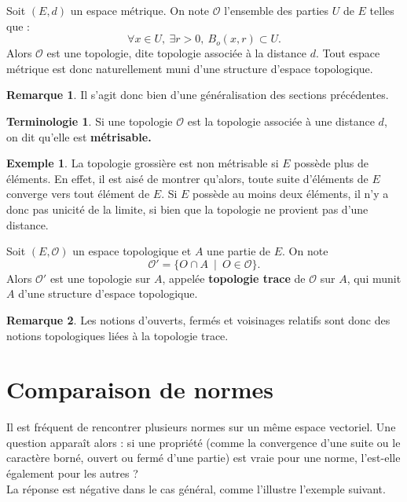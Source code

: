 \documentclass[french]{article}
\theoremstyle{plain}
\theoremstyle{definition}
\newtheorem*{ex}{Exemple}
\newtheorem*{rmq}{Remarque}
\newtheorem*{terminologie}{Terminologie}
\theoremstyle{remark}
\begin{document}
\begin{thm}
	Soit $(E,d)$ un espace métrique. On note $\mathcal{O}$ l'ensemble des parties $U$ de $E$ telles que : $$\forall x\in U,\ \exists r>0,\ B_o(x,r)\subset U.$$ Alors $\mathcal{O}$ est une topologie, dite topologie associée à la distance $d$. Tout espace métrique est donc naturellement muni d'une structure d'espace topologique.
\end{thm}

\begin{rmq}
	Il s'agit donc bien d'une généralisation des sections précédentes.
\end{rmq}

\begin{terminologie}
	Si une topologie $\mathcal{O}$ est la topologie associée à une distance $d$, on dit qu'elle est \textbf{métrisable.}
\end{terminologie}

\begin{ex}
	La topologie grossière est non métrisable si $E$ possède plus de éléments. En effet, il est aisé  de montrer qu'alors, toute suite d'éléments de $E$ converge vers tout élément de $E$. Si $E$ possède au moins deux éléments, il n'y a donc pas unicité de la limite, si bien que la topologie ne provient pas d'une distance.
\end{ex}

\begin{dfn}
	Soit $(E,\mathcal{O})$ un espace topologique et $A$ une partie de $E$. On note $$\mathcal{O}'=\{O\cap A\ \mid\ O\in\mathcal{O}\}.$$ Alors $\mathcal{O}'$ est une topologie sur $A$, appelée \textbf{topologie trace} de $\mathcal{O}$ sur $A$, qui munit $A$ d'une structure d'espace topologique.
\end{dfn}

\begin{rmq}
	Les notions d'ouverts, fermés et voisinages relatifs sont donc des notions topologiques liées à la topologie trace.
\end{rmq}

\section{Comparaison de normes}

Il est fréquent de rencontrer plusieurs normes sur un même espace vectoriel. Une question apparaît alors : si une propriété (comme la convergence d'une suite ou le caractère borné, ouvert ou fermé d'une partie) est vraie pour une norme, l'est-elle également pour les autres ?\\
La réponse est négative dans le cas général, comme l'illustre l'exemple suivant.
\end{document}
